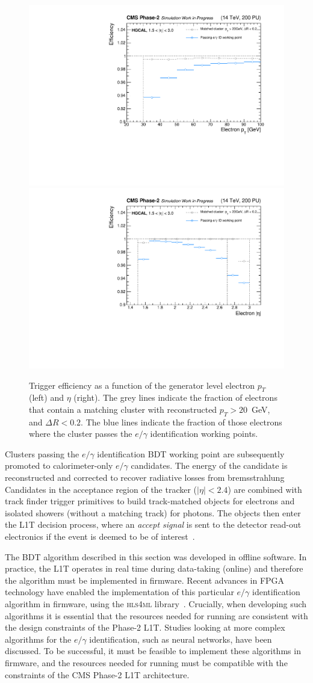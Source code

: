\begin{figure}[htb!]
  \centering
  \includegraphics[width=.49\textwidth]{Figures/cms/egid/eff_vs_cl3d_gen_pt.pdf}
  \includegraphics[width=.49\textwidth]{Figures/cms/egid/eff_vs_cl3d_gen_eta.pdf}
  \caption[Efficiency of the $e/\gamma$ identification as a function of electron $p_T$ and $\eta$.]
  {
    Trigger efficiency as a function of the generator level electron $p_T$ (left) and $\eta$ (right). The grey lines indicate the fraction of electrons that contain a matching cluster with reconstructed $p_T>20$~GeV, and $\Delta R<0.2$. The blue lines indicate the fraction of those electrons where the cluster passes the $e/\gamma$ identification working points.
  }
  \label{fig:egid_efficiency}
\end{figure}

Clusters passing the $e/\gamma$ identification BDT working point are subsequently promoted to calorimeter-only $e/\gamma$ candidates. The energy of the candidate is reconstructed and corrected to recover radiative losses from bremsstrahlung Candidates in the acceptance region of the tracker ($|\eta|<2.4$) are combined with track finder trigger primitives to build track-matched objects for electrons and isolated showers (without a matching track) for photons. The objects then enter the L1T decision process, where an \textit{accept signal} is sent to the detector read-out electronics if the event is deemed to be of interest~\cite{CERN-LHCC-2020-004}.

The BDT algorithm described in this section was developed in offline software. In practice, the L1T operates in real time during data-taking (online) and therefore the algorithm must be implemented in firmware. Recent advances in FPGA technology have enabled the implementation of this particular $e/\gamma$ identification algorithm in firmware, using the \textsc{hls4ml} library~\cite{Duarte_2018}. Crucially, when developing such algorithms it is essential that the resources needed for running are consistent with the design constraints of the Phase-2 L1T. Studies looking at more complex algorithms for the $e/\gamma$ identification, such as neural networks, have been discussed. To be successful, it must be feasible to implement these algorithms in firmware, and the resources needed for running must be compatible with the constraints of the CMS Phase-2 L1T architecture.

